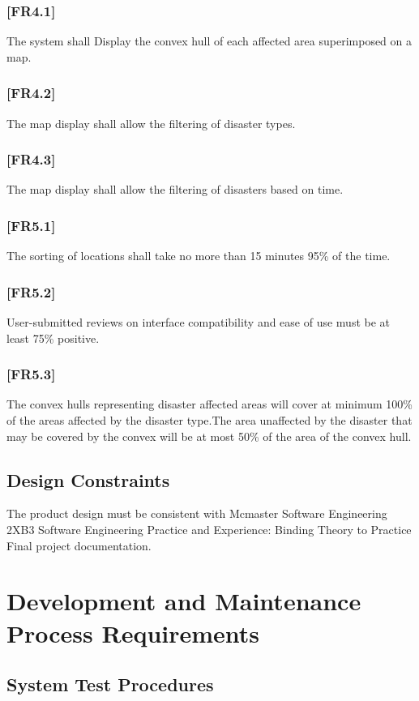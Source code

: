 \documentclass{article}
\begin{document}
        \subsubsection*{[FR4.1]} The system shall Display the convex hull of each affected area superimposed on a map.
        \subsubsection*{[FR4.2]} The map display shall allow the filtering of disaster types.
        \subsubsection*{[FR4.3]} The map display shall allow the filtering of disasters based on time.
        \subsubsection*{[FR5.1]} The sorting of locations shall take no more than 15 minutes 95\% of the time.
        \subsubsection*{[FR5.2]} User-submitted reviews on interface compatibility and ease of use must be at least 75\% positive.
        \subsubsection*{[FR5.3]} The convex hulls representing disaster affected areas will cover at minimum 100\% of the areas affected by the disaster type.The area unaffected by the disaster that may be covered by the convex will be at most 50\% of the area of the convex hull.

    \subsection{Design Constraints}
    The product design must be consistent with Mcmaster Software Engineering 
    2XB3 Software Engineering Practice and Experience: Binding Theory to Practice 
    Final project documentation.
    
    \section{Development and Maintenance Process Requirements}
    \subsection{System Test Procedures}
\end{document}
